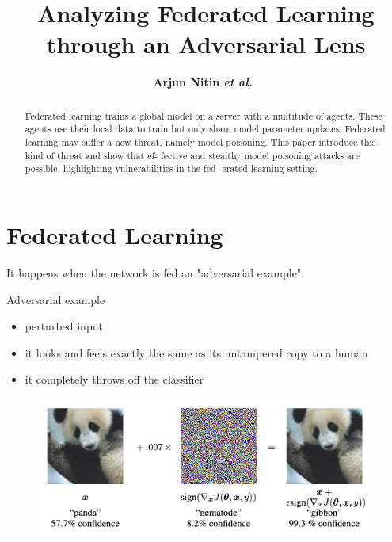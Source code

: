 \documentclass[11pt]{article}
\numberwithin{equation}{section}
\newcommand{\etal}{{\em et al.}\ }
\begin{document}


\title{Analyzing Federated Learning through an Adversarial Lens}

\author{\textbf{Arjun Nitin \etal}}


\maketitle

\begin{abstract}
Federated learning trains a global model on a server with a multitude of agents. These agents use their local data to train but only share model parameter updates. Federated learning may suffer a new threat, namely model poisoning. This paper introduce this kind of threat and show that ef- fective and stealthy model poisoning attacks are possible, highlighting vulnerabilities in the fed- erated learning setting.

\end{abstract}

\section{Federated Learning} 

It happens when the network is fed an "adversarial example".

\colorbox{orange!15}{Adversarial example}

\begin{itemize}
    \item perturbed input
    \item it looks and feels exactly the same as its untampered copy to a human
    \item it completely throws off the classifier
\end{itemize}

\begin{figure}[!h]
	\centering
	\includegraphics[width=12cm]{figures/evasion.png}
	\label{fig:evasion}
\end{figure}
\end{document}
